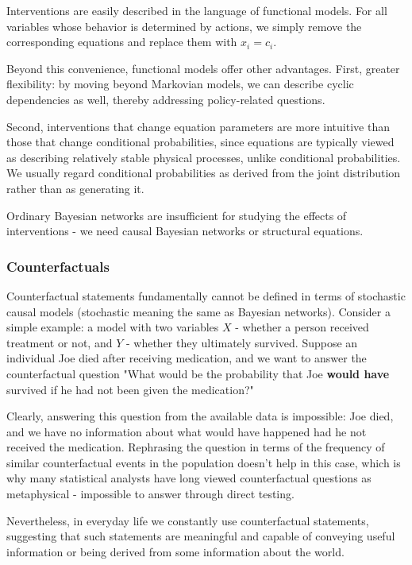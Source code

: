 \documentclass[fleqn]{article}
\numberwithin{equation}{section}
\numberwithin{theorem}{section}
\numberwithin{figure}{section}
\numberwithin{lemma}{section}
\numberwithin{corollary}{section}
\begin{document}
Interventions are easily described in the language of functional models. For all variables whose behavior is determined by actions, we simply remove the corresponding equations and replace them with $x_i = c_i$. 

Beyond this convenience, functional models offer other advantages. First, greater flexibility: by moving beyond Markovian models, we can describe cyclic dependencies as well, thereby addressing policy-related questions.

Second, interventions that change equation parameters are more intuitive than those that change conditional probabilities, since equations are typically viewed as describing relatively stable physical processes, unlike conditional probabilities. We usually regard conditional probabilities as derived from the joint distribution rather than as generating it. 

Ordinary Bayesian networks are insufficient for studying the effects of interventions - we need causal Bayesian networks or structural equations.

\subsubsection*{Counterfactuals}

Counterfactual statements fundamentally cannot be defined in terms of stochastic causal models (stochastic meaning the same as Bayesian networks). Consider a simple example: a model with two variables $X$ - whether a person received treatment or not, and $Y$ - whether they ultimately survived. Suppose an individual Joe died after receiving medication, and we want to answer the counterfactual question "What would be the probability that Joe \textbf{would have} survived if he had not been given the medication?"

Clearly, answering this question from the available data is impossible: Joe died, and we have no information about what would have happened had he not received the medication. Rephrasing the question in terms of the frequency of similar counterfactual events in the population doesn't help in this case, which is why many statistical analysts have long viewed counterfactual questions as metaphysical - impossible to answer through direct testing.

Nevertheless, in everyday life we constantly use counterfactual statements, suggesting that such statements are meaningful and capable of conveying useful information or being derived from some information about the world.
\end{document}
